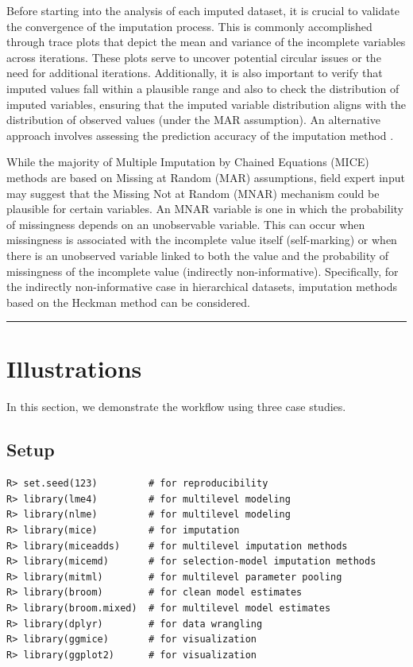 \documentclass[
  article]{jss}
\begin{document}
Before starting into the analysis of each imputed dataset, it is crucial
to validate the convergence of the imputation process. This is commonly
accomplished through trace plots that depict the mean and variance of
the incomplete variables across iterations. These plots serve to uncover
potential circular issues or the need for additional iterations.
Additionally, it is also important to verify that imputed values fall
within a plausible range and also to check the distribution of imputed
variables, ensuring that the imputed variable distribution aligns with
the distribution of observed values (under the MAR assumption). An
alternative approach involves assessing the prediction accuracy of the
imputation method \cite{cai2023}.

While the majority of Multiple Imputation by Chained Equations (MICE)
methods are based on Missing at Random (MAR) assumptions, field expert
input may suggest that the Missing Not at Random (MNAR) mechanism could
be plausible for certain variables. An MNAR variable is one in which the
probability of missingness depends on an unobservable variable. This can
occur when missingness is associated with the incomplete value itself
(self-marking) or when there is an unobserved variable linked to both
the value and the probability of missingness of the incomplete value
(indirectly non-informative). Specifically, for the indirectly
non-informative case in hierarchical datasets, imputation methods based
on the Heckman method can be
considered.\cite{hammon2020,hammon2022,munoz2023b}

\begin{center}\rule{0.5\linewidth}{0.5pt}\end{center}

\hypertarget{sec-illustrations}{%
\section{Illustrations}\label{sec-illustrations}}

In this section, we demonstrate the workflow using three case studies.

\hypertarget{setup}{%
\subsection{Setup}\label{setup}}

\begin{verbatim}
R> set.seed(123)         # for reproducibility
R> library(lme4)         # for multilevel modeling
R> library(nlme)         # for multilevel modeling
R> library(mice)         # for imputation
R> library(miceadds)     # for multilevel imputation methods
R> library(micemd)       # for selection-model imputation methods
R> library(mitml)        # for multilevel parameter pooling
R> library(broom)        # for clean model estimates
R> library(broom.mixed)  # for multilevel model estimates
R> library(dplyr)        # for data wrangling
R> library(ggmice)       # for visualization
R> library(ggplot2)      # for visualization
\end{verbatim}
\end{document}
